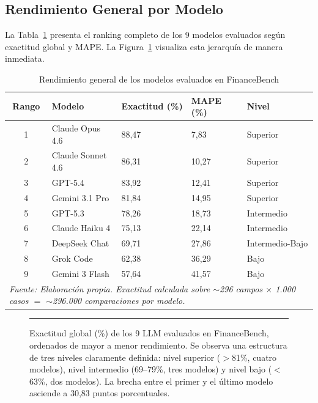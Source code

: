 \documentclass[12pt,a4paper]{article}
\begin{document}
\subsection{Rendimiento General por Modelo}

La Tabla~\ref{tab:ranking} presenta el ranking completo de los 9 modelos evaluados según exactitud global y MAPE. La Figura~\ref{fig:ranking} visualiza esta jerarquía de manera inmediata.

\begin{table}[ht]
\centering
\caption{Rendimiento general de los modelos evaluados en FinanceBench}
\label{tab:ranking}
\begin{tabularx}{\linewidth}{clXXl}
\toprule
\textbf{Rango} & \textbf{Modelo} & \textbf{Exactitud (\%)} & \textbf{MAPE (\%)} & \textbf{Nivel} \\
\midrule
1 & Claude Opus 4.6   & 88,47 & 7,83  & Superior        \\
2 & Claude Sonnet 4.6 & 86,31 & 10,27 & Superior        \\
3 & GPT-5.4           & 83,92 & 12,41 & Superior        \\
4 & Gemini 3.1 Pro    & 81,84 & 14,95 & Superior        \\
5 & GPT-5.3           & 78,26 & 18,73 & Intermedio      \\
6 & Claude Haiku 4    & 75,13 & 22,14 & Intermedio      \\
7 & DeepSeek Chat     & 69,71 & 27,86 & Intermedio-Bajo \\
8 & Grok Code         & 62,38 & 36,29 & Bajo            \\
9 & Gemini 3 Flash    & 57,64 & 41,57 & Bajo            \\
\bottomrule
\multicolumn{5}{l}{\footnotesize\textit{Fuente: Elaboración propia. Exactitud calculada sobre $\sim$296 campos $\times$ 1.000 casos $=$ $\sim$296.000 comparaciones por modelo.}}
\end{tabularx}
\end{table}

\begin{figure}[ht]
\centering
\rule{0.9\linewidth}{5.5cm}
\caption{Exactitud global (\%) de los 9 LLM evaluados en FinanceBench, ordenados de mayor a menor rendimiento. Se observa una estructura de tres niveles claramente definida: nivel superior ($>$81\%, cuatro modelos), nivel intermedio (69--79\%, tres modelos) y nivel bajo ($<$63\%, dos modelos). La brecha entre el primer y el último modelo asciende a 30,83 puntos porcentuales.}
\label{fig:ranking}
\end{figure}
\end{document}
